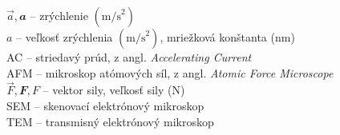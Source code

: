 %
%
$\vec{a}, \mathbfit{a}$ -- zrýchlenie $(\mathrm{m/s}^2)$\\
$a$ -- veľkosť zrýchlenia $(\mathrm{m/s}^2)$, mriežková konštanta (nm)\\
AC -- striedavý prúd, z angl. \emph{\foreignlanguage{english}{Accelerating Current}}\\
AFM -- mikroskop atómových síl, z angl. \emph{\foreignlanguage{english}{Atomic Force Microscope}}\\
$\vec{F}, \mathbfit{F}, F$ – vektor sily, veľkosť sily (N)\\
SEM -- skenovací elektrónový mikroskop\\
TEM -- transmisný elektrónový mikroskop\\

